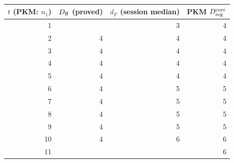\begin{tabular}{@{}rrrr@{}}
\toprule
$t$ (PKM: $n_1$) & $D_{\rm ff}$ (proved) & $d_F$ (session median) & PKM $D_{\rm reg}^{\rm corr}$ \\
\midrule
1 &  & 3 & 4 \\
2 & 4 & 4 & 4 \\
3 & 4 & 4 & 4 \\
4 & 4 & 4 & 4 \\
5 & 4 & 4 & 4 \\
6 & 4 & 5 & 5 \\
7 & 4 & 5 & 5 \\
8 & 4 & 5 & 5 \\
9 & 4 & 5 & 5 \\
10 & 4 & 6 & 6 \\
11 &  &  & 6 \\
\bottomrule
\end{tabular}
